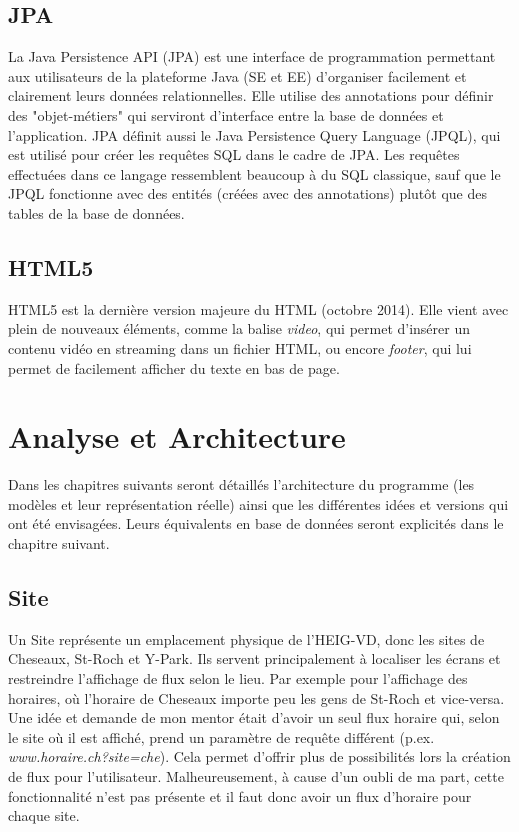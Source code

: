 \documentclass[french]{article}
\begin{document}
\subsection{JPA}
La Java Persistence API (JPA) est une interface de programmation permettant aux utilisateurs de la plateforme Java (SE et EE) d'organiser facilement et clairement leurs données relationnelles. Elle utilise des annotations pour définir des "objet-métiers" qui serviront d'interface entre la base de données et l'application. \newline
JPA définit aussi le Java Persistence Query Language (JPQL), qui est utilisé pour créer les requêtes SQL dans le cadre de JPA. Les requêtes effectuées dans ce langage ressemblent beaucoup à du SQL classique, sauf que le JPQL fonctionne avec des entités (créées avec des annotations) plutôt que des tables de la base de données.

\subsection{HTML5}
HTML5 est la dernière version majeure du HTML (octobre 2014). Elle vient avec plein de nouveaux éléments, comme la balise \textit{video}, qui permet d'insérer un contenu vidéo en streaming dans un fichier HTML, ou encore \textit{footer}, qui lui permet de facilement afficher du texte en bas de page.

\newpage
\section{Analyse et Architecture}

Dans les chapitres suivants seront détaillés l'architecture du programme (les modèles et leur représentation réelle) ainsi que les différentes idées et versions qui ont été envisagées. Leurs équivalents en base de données seront explicités dans le chapitre suivant.

\subsection{Site}
Un Site représente un emplacement physique de l'HEIG-VD, donc les sites de Cheseaux, St-Roch et Y-Park. Ils servent principalement à localiser les écrans et restreindre l'affichage de flux selon le lieu. Par exemple pour l'affichage des horaires, où l'horaire de Cheseaux importe peu les gens de St-Roch et vice-versa.\newline
 Une idée et demande de mon mentor était d'avoir un seul flux horaire qui, selon le site où il est affiché, prend un paramètre de requête différent (p.ex. \textit{www.horaire.ch?site=che}). Cela permet d'offrir plus de possibilités lors la création de flux pour l'utilisateur. Malheureusement, à cause d'un oubli de ma part, cette fonctionnalité n'est pas présente et il faut donc avoir un flux d'horaire pour chaque site.
 
\end{document}
